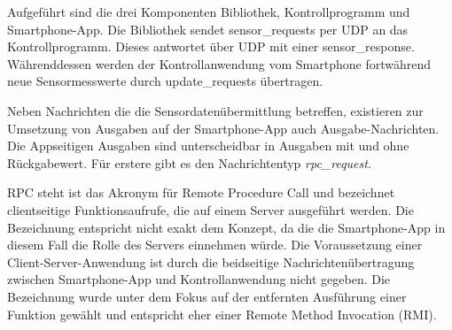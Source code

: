 \documentclass[11pt,a4paper]{report}
\begin{document}
Aufgeführt sind die drei Komponenten Bibliothek, Kontrollprogramm und Smartphone-App.
Die Bibliothek sendet sensor\_requests per UDP an das Kontrollprogramm.
Dieses antwortet über UDP mit einer sensor\_response.
Währenddessen werden der Kontrollanwendung vom Smartphone fortwährend neue Sensormesswerte durch update\_requests übertragen.

Neben Nachrichten die die Sensordatenübermittlung betreffen, existieren zur Umsetzung von Ausgaben auf der Smartphone-App auch Ausgabe-Nachrichten.
Die Appseitigen Ausgaben sind unterscheidbar in Ausgaben mit und ohne Rückgabewert.
Für erstere gibt es den Nachrichtentyp \textit{rpc\_request}.

RPC steht ist das Akronym für Remote Procedure Call und bezeichnet clientseitige Funktionsaufrufe, die auf einem Server ausgeführt werden.
Die Bezeichnung entspricht nicht exakt dem Konzept, da die die Smartphone-App in diesem Fall die Rolle des Servers einnehmen würde.
Die Voraussetzung einer Client-Server-Anwendung ist durch die beidseitige Nachrichtenübertragung zwischen Smartphone-App und Kontrollanwendung nicht gegeben.
Die Bezeichnung wurde unter dem Fokus auf der entfernten Ausführung einer Funktion gewählt und entspricht eher einer Remote Method Invocation (RMI).
\end{document}
